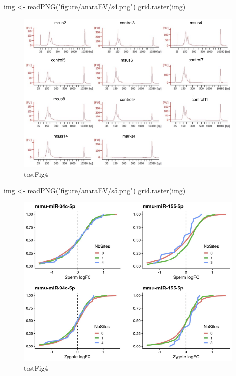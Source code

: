 \documentclass[12pt,twoside]{reedthesis}
\newenvironment{Shaded}{\begin{snugshade}}{\end{snugshade}}
\newcommand{\FunctionTok}[1]{\textcolor[rgb]{0.00,0.00,0.00}{#1}}
\newcommand{\NormalTok}[1]{#1}
\newcommand{\OtherTok}[1]{\textcolor[rgb]{0.56,0.35,0.01}{#1}}
\newcommand{\StringTok}[1]{\textcolor[rgb]{0.31,0.60,0.02}{#1}}
\begin{document}
\begin{Shaded}
\begin{Highlighting}[]
\NormalTok{img }\OtherTok{\textless{}{-}} \FunctionTok{readPNG}\NormalTok{(}\StringTok{"figure/anaraEV/s4.png"}\NormalTok{)}
\FunctionTok{grid.raster}\NormalTok{(img)}
\end{Highlighting}
\end{Shaded}
\begin{figure}[H]

{\centering \includegraphics{thesis_files/figure-latex/sfig4-1} 

}

\caption{testFig4}\label{fig:sfig4}
\end{figure}
\begin{Shaded}
\begin{Highlighting}[]
\NormalTok{img }\OtherTok{\textless{}{-}} \FunctionTok{readPNG}\NormalTok{(}\StringTok{"figure/anaraEV/s5.png"}\NormalTok{)}
\FunctionTok{grid.raster}\NormalTok{(img)}
\end{Highlighting}
\end{Shaded}
\begin{figure}[H]

{\centering \includegraphics{thesis_files/figure-latex/sfig5-1} 

}

\caption{testFig4}\label{fig:sfig5}
\end{figure}
\end{document}
